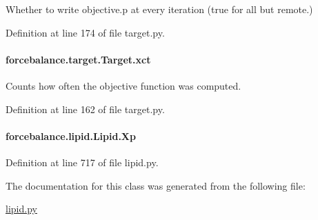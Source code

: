 Whether to write objective.\-p at every iteration (true for all but remote.) 



Definition at line 174 of file target.\-py.

\hypertarget{classforcebalance_1_1target_1_1Target_aad2e385cfbf7b4a68f1c2cb41133fe82}{
\paragraph[{xct}]{\setlength{\rightskip}{0pt plus 5cm}forcebalance.\-target.\-Target.\-xct\hspace{0.3cm}{\ttfamily [inherited]}}}\label{classforcebalance_1_1target_1_1Target_aad2e385cfbf7b4a68f1c2cb41133fe82}


Counts how often the objective function was computed. 



Definition at line 162 of file target.\-py.

\hypertarget{classforcebalance_1_1lipid_1_1Lipid_a56ebab6f8e310afff1b15786ac819eec}{
\paragraph[{Xp}]{\setlength{\rightskip}{0pt plus 5cm}forcebalance.\-lipid.\-Lipid.\-Xp}}\label{classforcebalance_1_1lipid_1_1Lipid_a56ebab6f8e310afff1b15786ac819eec}


Definition at line 717 of file lipid.\-py.



The documentation for this class was generated from the following file\-:\begin{DoxyCompactItemize}
\item 
\hyperlink{lipid_8py}{lipid.\-py}\end{DoxyCompactItemize}

